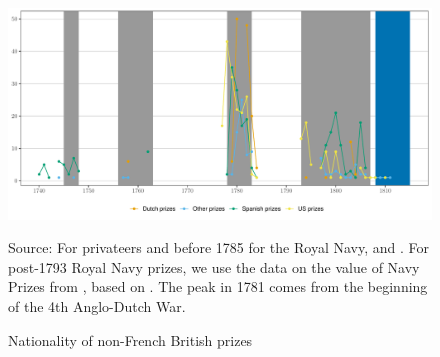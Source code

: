 \documentclass[12pt,a4paper,notitlepage,english]{article}
\newcommand{\source}[1]{\caption*{\footnotesize Source: {#1}} }
\begin{document}
\begin{appendix}
\begin{figure}[h!]
\caption{Nationality of non-French British prizes}
\label{fig:prizes_nationality}
\begin{minipage}{0.9\textwidth}
\centering
\includegraphics[scale=.8]{Prizes_nationality}
\source{For privateers and before 1785 for the Royal Navy, \cite{Starkey1990} and \cite{Hillmann2011}. For post-1793 Royal Navy prizes, we use the data on the value of Navy Prizes from \cite{Benjamin2009}, based on \cite{Hill1998}.
The peak in 1781 comes from the beginning of the 4th Anglo-Dutch War. }
\end{minipage}
\end{figure}


\end{appendix}
\end{document}
